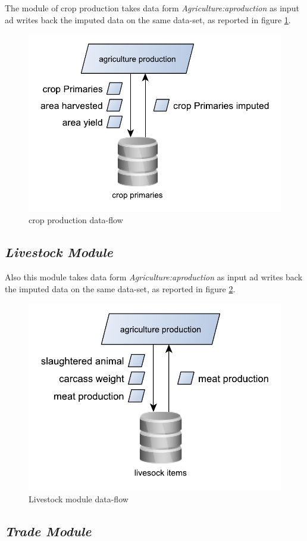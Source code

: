 \documentclass[]{article}
\begin{document}
The module of crop production takes data form
\emph{Agriculture:aproduction} as input ad writes back the imputed data
on the same data-set, as reported in figure \ref{fig:f6}.

\begin{figure}[H]

{\centering \includegraphics[width=0.5\linewidth]{images/SwsFbs/06_cropProduction} 

}

\caption{\label{fig:f6}crop production data-flow}\label{fig:f6}
\end{figure}

\subsection{\texorpdfstring{\emph{Livestock
Module}}{Livestock Module}}\label{livestock-module}

Also this module takes data form \emph{Agriculture:aproduction} as input
ad writes back the imputed data on the same data-set, as reported in
figure \ref{fig:f7}.

\begin{figure}[H]

{\centering \includegraphics[width=0.5\linewidth]{images/SwsFbs/07_Livestock} 

}

\caption{\label{fig:f7}Livestock module data-flow}\label{fig:f7}
\end{figure}

\subsection{\texorpdfstring{\emph{Trade
Module}}{Trade Module}}\label{trade-module}
\end{document}
